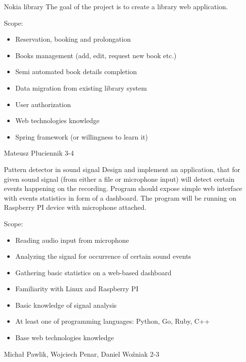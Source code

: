 \begin{project}
{Nokia library}
{The goal of the project is to create a library web application.} 
{
Scope:
\begin{itemize}
	\item Reservation, booking and prolongation
	\item Books management (add, edit, request new book etc.)
	\item Semi automated book details completion
	\item Data migration from existing library system
	\item User authorization
\end{itemize}
}
{
\begin{itemize}
	\item Web technologies knowledge
	\item Spring framework (or willingness to learn it)
\end{itemize}
}
{Mateusz Płuciennik}
{3-4}
\end{project}
\begin{project}
{Pattern detector in sound signal}
{Design and implement an application, that for given sound signal (from either a file or microphone input) will detect certain events happening on the recording. Program should expose simple web interface with events statistics in form of a dashboard. The program will be running on Raspberry PI device with microphone attached.} 
{
Scope:
\begin{itemize}
	\item Reading audio input from microphone
	\item Analyzing the signal for occurrence of certain sound events
	\item Gathering basic statistics on a web-based dashboard
\end{itemize}
}
{
\begin{itemize}
	\item Familiarity with Linux and Raspberry PI
	\item Basic knowledge of signal analysis
	\item At least one of programming languages: Python, Go, Ruby, C++
	\item Base web technologies knowledge
\end{itemize}
}
{Michał Pawlik, Wojciech Penar, Daniel Woźniak}
{2-3}
\end{project}
